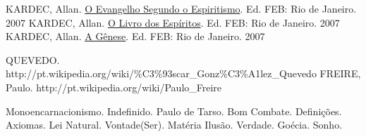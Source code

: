 \documentclass[12pt,a4paper]{article}
\begin{document}
	\begin{thebibliography}{15}

		 KARDEC, Allan. \href{https://github.com/boralaemcasa/propagation/tree/master/webs%20dot%20com/citacoes/Allan Kardec - O Evangelho Segundo o Espiritismo.pdf}{O Evangelho Segundo o Espiritismo}. Ed. FEB: Rio de Janeiro. 2007
		 KARDEC, Allan. \href{https://github.com/boralaemcasa/propagation/tree/master/webs%20dot%20com/citacoes/Allan Kardec - O Livro dos Espiritos.pdf}{O Livro dos Esp\'iritos}. Ed. FEB: Rio de Janeiro. 2007
		 KARDEC, Allan. \href{https://github.com/boralaemcasa/propagation/tree/master/webs%20dot%20com/citacoes/Allan Kardec - A Genese.pdf}{A G\^enese}. Ed. FEB: Rio de Janeiro. 2007

		 QUEVEDO. http://pt.wikipedia.org/wiki/\%C3\%93scar\_Gonz\%C3\%A1lez\_Quevedo
		 FREIRE, Paulo. http://pt.wikipedia.org/wiki/Paulo\_Freire

		 Monoencarnacionismo.
		 Indefinido.
		 Paulo de Tarso. Bom Combate.
		 Defini\c{c}\~oes. Axiomas.
		 Lei Natural.
		 Vontade(Ser).
		 Mat\'eria
		 Ilus\~ao.
		 Verdade.
		 Go\'ecia.
		 Sonho.

	\end{thebibliography}

	\addtocontents{}{\noindent\protect\rule{\textwidth}{.2pt}\par}
\end{document}

